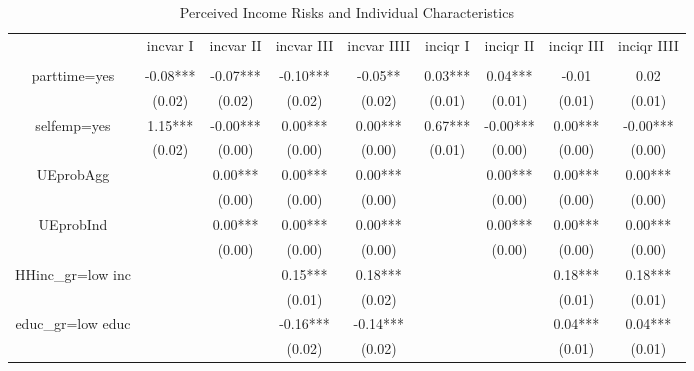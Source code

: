 
\begin{table}[p]
\centering
\begin{adjustbox}{width=\textwidth}
\begin{threeparttable}
\caption{Perceived Income Risks and Individual Characteristics}
\label{micro_reg}\begin{tabular}{ccccccccc}
\toprule
{} &  incvar I & incvar II & incvar III & incvar IIII & inciqr I & inciqr II & inciqr III & inciqr IIII \\
                 &           &           &            &             &          &           &            &             \\
\midrule
parttime=yes     &  -0.08*** &  -0.07*** &   -0.10*** &     -0.05** &  0.03*** &   0.04*** &      -0.01 &        0.02 \\
                 &    (0.02) &    (0.02) &     (0.02) &      (0.02) &   (0.01) &    (0.01) &     (0.01) &      (0.01) \\
selfemp=yes      &   1.15*** &  -0.00*** &    0.00*** &     0.00*** &  0.67*** &  -0.00*** &    0.00*** &    -0.00*** \\
                 &    (0.02) &    (0.00) &     (0.00) &      (0.00) &   (0.01) &    (0.00) &     (0.00) &      (0.00) \\
UEprobAgg        &           &   0.00*** &    0.00*** &     0.00*** &          &   0.00*** &    0.00*** &     0.00*** \\
                 &           &    (0.00) &     (0.00) &      (0.00) &          &    (0.00) &     (0.00) &      (0.00) \\
UEprobInd        &           &   0.00*** &    0.00*** &     0.00*** &          &   0.00*** &    0.00*** &     0.00*** \\
                 &           &    (0.00) &     (0.00) &      (0.00) &          &    (0.00) &     (0.00) &      (0.00) \\
HHinc\_gr=low inc &           &           &    0.15*** &     0.18*** &          &           &    0.18*** &     0.18*** \\
                 &           &           &     (0.01) &      (0.02) &          &           &     (0.01) &      (0.01) \\
educ\_gr=low educ &           &           &   -0.16*** &    -0.14*** &          &           &    0.04*** &     0.04*** \\
                 &           &           &     (0.02) &      (0.02) &          &           &     (0.01) &      (0.01) \\

\end{tabular}
\end{threeparttable}
\end{adjustbox}
\end{table}
